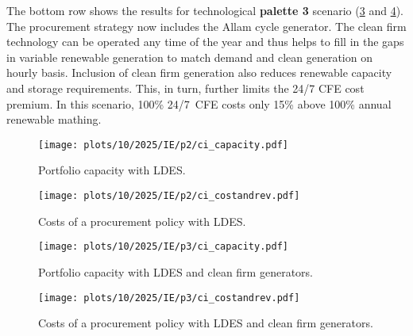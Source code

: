 The bottom row shows the results for technological \textbf{palette 3} scenario (\cref{fig:10-2025-IE-p3-ci_capacity} and \cref{fig:10-2025-IE-p3-ci_costandrev}). 
The procurement strategy now includes the Allam cycle generator.
The clean firm technology can be operated any time of the year and thus helps to fill in the gaps in variable renewable generation to match demand and clean generation on hourly basis.
Inclusion of clean firm generation also reduces renewable capacity and storage requirements. 
This, in turn, further limits the 24/7 CFE cost premium.
In this scenario, 100\% 24/7~CFE costs only 15\% above 100\% annual renewable mathing.

\begin{figure*}
    \centering
    \begin{subfigure}{0.5\textwidth}
        \centering
        \caption{Portfolio capacity with LDES.}
        \texttt{[image: plots/10/2025/IE/p2/ci\_capacity.pdf]}
        \label{fig:10-2025-IE-p2-ci_capacity}
    \end{subfigure}%
    \begin{subfigure}{0.5\textwidth}
        \centering
        \caption{Costs of a procurement policy with LDES.}
        \texttt{[image: plots/10/2025/IE/p2/ci\_costandrev.pdf]}
        \label{fig:10-2025-IE-p2-ci_costandrev}
    \end{subfigure}
    \begin{subfigure}{0.5\textwidth}
        \centering
        \caption{Portfolio capacity with LDES and clean firm generators.}
        \texttt{[image: plots/10/2025/IE/p3/ci\_capacity.pdf]}
        \label{fig:10-2025-IE-p3-ci_capacity}
    \end{subfigure}%
    \begin{subfigure}{0.5\textwidth}
        \centering
        \caption{Costs of a procurement policy with LDES and clean firm generators.}
        \texttt{[image: plots/10/2025/IE/p3/ci\_costandrev.pdf]}
        \label{fig:10-2025-IE-p3-ci_costandrev}
    \end{subfigure}
    \caption{Procurement of clean resources and energy storage if \gls{ci} consumers located in Ireland have an access to a wider palette of technologies.
    The top row shows the power capacity portfolio (\cref{fig:10-2025-IE-p2-ci_capacity}) and the breakdown of costs (\cref{fig:10-2025-IE-p2-ci_costandrev}) 
    if \gls{ldes} is available on the market.
    The bottom row shows the power capacity portfolio (\cref{fig:10-2025-IE-p3-ci_capacity}) and the breakdown of costs (\cref{fig:10-2025-IE-p3-ci_costandrev}) 
    for a case when both \gls{ldes} and clean firm dispatchable generators are available.}
    \label{fig:10-2025-IE-p23-ci_procurement}
\end{figure*}


